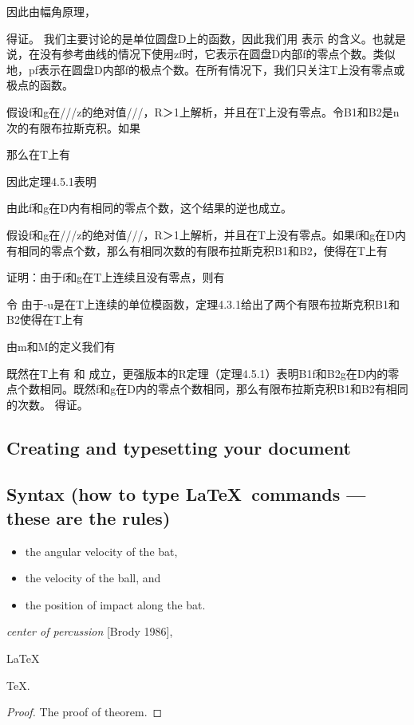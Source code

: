 \documentclass{mcmthesis}
\begin{document}
因此由幅角原理，




得证。
我们主要讨论的是单位圆盘D上的函数，因此我们用   表示   的含义。也就是说，在没有参考曲线的情况下使用zf时，它表示在圆盘D内部f的零点个数。类似地，pf表示在圆盘D内部f的极点个数。在所有情况下，我们只关注T上没有零点或极点的函数。

假设f和g在///z的绝对值///，R＞1上解析，并且在T上没有零点。令B1和B2是n次的有限布拉斯克积。如果


那么在T上有

因此定理4.5.1表明

由此f和g在D内有相同的零点个数，这个结果的逆也成立。



假设f和g在///z的绝对值///，R＞1上解析，并且在T上没有零点。如果f和g在D内有相同的零点个数，那么有相同次数的有限布拉斯克积B1和B2，使得在T上有


证明：由于f和g在T上连续且没有零点，则有

令
由于-u是在T上连续的单位模函数，定理4.3.1给出了两个有限布拉斯克积B1和B2使得在T上有

由m和M的定义我们有


既然在T上有        和         成立，更强版本的R定理（定理4.5.1）表明B1f和B2g在D内的零点个数相同。既然f和g在D内的零点个数相同，那么有限布拉斯克积B1和B2有相同的次数。
得证。

\subsection{Creating and typesetting your document}

\subsection{Syntax (how to type \LaTeX\ commands --- these
  are the rules)}

\lipsum[3]
\begin{itemize}
\item the angular velocity of the bat,
\item the velocity of the ball, and
\item the position of impact along the bat.
\end{itemize}
\lipsum[4]
\emph{center of percussion} [Brody 1986], \lipsum[5]

\begin{Theorem} \label{thm:latex}
\LaTeX
\end{Theorem}
\begin{Lemma} \label{thm:tex}
\TeX .
\end{Lemma}
\begin{proof}
The proof of theorem.
\end{proof}
\end{document}
